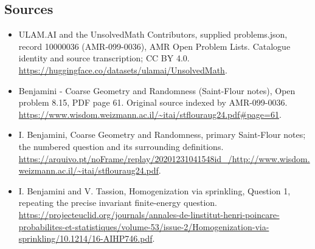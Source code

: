 \documentclass[11pt,a4paper]{article}
\begin{document}
\subsection{Sources}
\begin{itemize}
\item[S1] ULAM.AI and the UnsolvedMath Contributors, supplied problems.json, record 10000036 (AMR-099-0036), AMR Open Problem Lists. Catalogue identity and source transcription; CC BY 4.0.
\url{https://huggingface.co/datasets/ulamai/UnsolvedMath}.
\item[S2] Benjamini - Coarse Geometry and Randomness (Saint-Flour notes), Open problem 8.15, PDF page 61. Original source indexed by AMR-099-0036.
\url{https://www.wisdom.weizmann.ac.il/~itai/stflouraug24.pdf#page=61}.
\item[S3] I. Benjamini, Coarse Geometry and Randomness, primary Saint-Flour notes; the numbered question and its surrounding definitions.
\url{https://arquivo.pt/noFrame/replay/20201231041548id_/http://www.wisdom.weizmann.ac.il/~itai/stflouraug24.pdf}.
\item[S4] I. Benjamini and V. Tassion, Homogenization via sprinkling, Question 1, repeating the precise invariant finite-energy question.
\url{https://projecteuclid.org/journals/annales-de-linstitut-henri-poincare-probabilites-et-statistiques/volume-53/issue-2/Homogenization-via-sprinkling/10.1214/16-AIHP746.pdf}.
\end{itemize}
\end{document}
